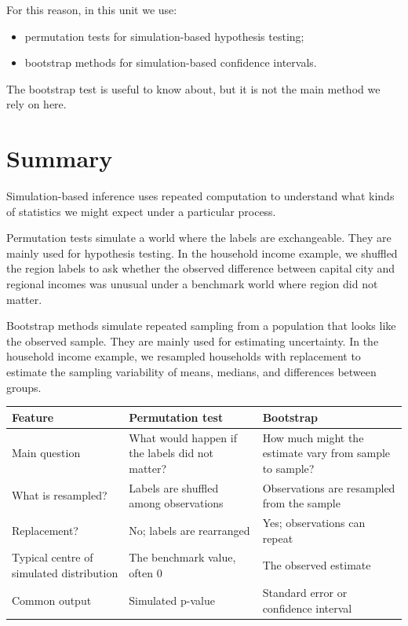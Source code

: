 \documentclass[
  letterpaper,
  DIV=11,
  numbers=noendperiod]{scrreprt}
\providecommand{\tightlist}{%
  \setlength{\itemsep}{0pt}\setlength{\parskip}{0pt}}
\begin{document}
For this reason, in this unit we use:

\begin{itemize}
\tightlist
\item
  permutation tests for simulation-based hypothesis testing;
\item
  bootstrap methods for simulation-based confidence intervals.
\end{itemize}

The bootstrap test is useful to know about, but it is not the main
method we rely on here.

\section{Summary}\label{summary}

Simulation-based inference uses repeated computation to understand what
kinds of statistics we might expect under a particular process.

Permutation tests simulate a world where the labels are exchangeable.
They are mainly used for hypothesis testing. In the household income
example, we shuffled the region labels to ask whether the observed
difference between capital city and regional incomes was unusual under a
benchmark world where region did not matter.

Bootstrap methods simulate repeated sampling from a population that
looks like the observed sample. They are mainly used for estimating
uncertainty. In the household income example, we resampled households
with replacement to estimate the sampling variability of means, medians,
and differences between groups.

\begin{table}
\fontsize{12.0pt}{14.0pt}\selectfont
\begin{tabular*}{1\linewidth}{@{\extracolsep{\fill}}lll}
\toprule
Feature & Permutation test & Bootstrap \\ 
\midrule\addlinespace[2.5pt]
Main question & What would happen if the labels did not matter? & How much might the estimate vary from sample to sample? \\ 
What is resampled? & Labels are shuffled among observations & Observations are resampled from the sample \\ 
Replacement? & No; labels are rearranged & Yes; observations can repeat \\ 
Typical centre of simulated distribution & The benchmark value, often 0 & The observed estimate \\ 
Common output & Simulated p-value & Standard error or confidence interval \\ 
\bottomrule
\end{tabular*}
\end{table}
\end{document}
